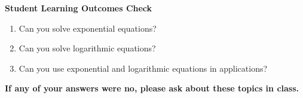 \noindent \textbf{Student Learning Outcomes Check}

\begin{enumerate}
\item Can you solve exponential equations?
\item Can you solve logarithmic equations?
\item Can you use exponential and logarithmic equations in applications?
\end{enumerate}

\noindent \textbf{If any of your answers were no, please ask about these topics in class.}


